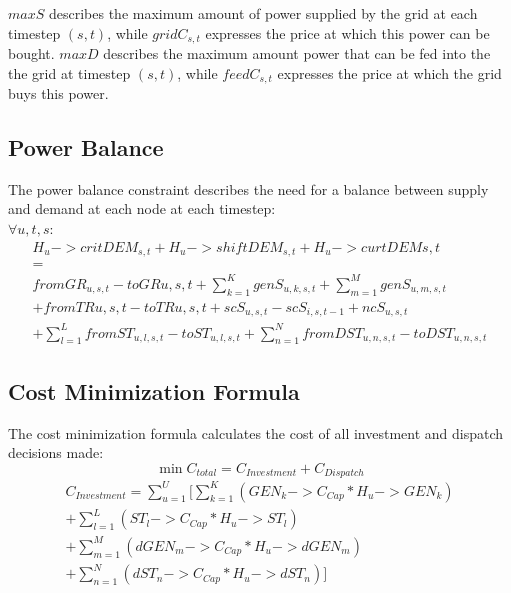 \documentclass[
	11pt,								%
	DIV10,								%
	a4paper,         					%
	oneside,							%
	headheight=20pt,					%
	footheight=20pt,					%
    parskip=full,						%
    listof=totoc,						%
	bibliography=totoc,					%
	index=totoc,						%
]{scrartcl}
\begin{document}
$maxS$ describes the maximum amount of power supplied by the grid at each timestep $(s,t)$, while $gridC_{s,t}$ expresses the price at which this power can be bought.
$maxD$ describes the maximum amount power that can be fed into the the grid at timestep $(s,t)$, while $feedC_{s,t}$ expresses the price at which the grid buys this power. 





\subsection{Power Balance}
The power balance constraint describes the need for a balance between supply and demand at each node at each timestep: \\

$\forall u,t,s$:
\begin{equation}
	\begin{split}
		H_u->critDEM_{s,t} + H_u->shiftDEM_{s,t} + H_u->curtDEM{s,t}\\
		= \\
		fromGR_{u,s,t} - toGR{u,s,t} + \sum_{k=1}^K{genS_{u,k,s,t}} + \sum_{m=1}^M{genS_{u,m,s,t}} \\ 
		+ fromTR{u,s,t} - toTR{u,s,t} + scS_{u,s,t} - scS_{i,s,t-1} + ncS_{u,s,t} \\
		+ \sum_{l=1}^L{fromST_{u,l,s,t} - toST_{u,l,s,t}} + \sum_{n=1}^N{fromDST_{u,n,s,t}-toDST_{u,n,s,t}}
	\end{split}
\end{equation}





\subsection{Cost Minimization Formula}
The cost minimization formula calculates the cost of all investment and dispatch decisions made:
\begin{equation}
	\min C_{total} = C_{Investment} + C_{Dispatch}
\end{equation}
\begin{equation}
	\begin{split}
		C_{Investment} = \sum_{u=1}^{U}[\sum_{k=1}^K{(GEN_k->C_{Cap} * H_u->GEN_k)}\\
		+ \sum_{l=1}^L{(ST_l->C_{Cap} * H_u->ST_l)}\\
		+ \sum_{m=1}^M{(dGEN_m->C_{Cap} * H_u->dGEN_m)}\\
		+ \sum_{n=1}^N{(dST_n->C_{Cap} * H_u->dST_n)}]
	\end{split}
\end{equation}
\end{document}

